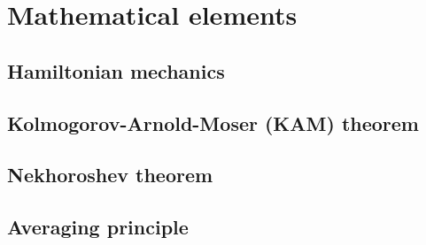 
\chapter{Mathematical elements}\label{ch:mathematical_elements}

\section{Hamiltonian mechanics}\label{sec:1:hamiltonian}

\section{Kolmogorov-Arnold-Moser (KAM) theorem}\label{sec:1:kam}

\section{Nekhoroshev theorem}\label{sec:1:nekhoroshev}

\section{Averaging principle}\label{sec:1:averaging}
